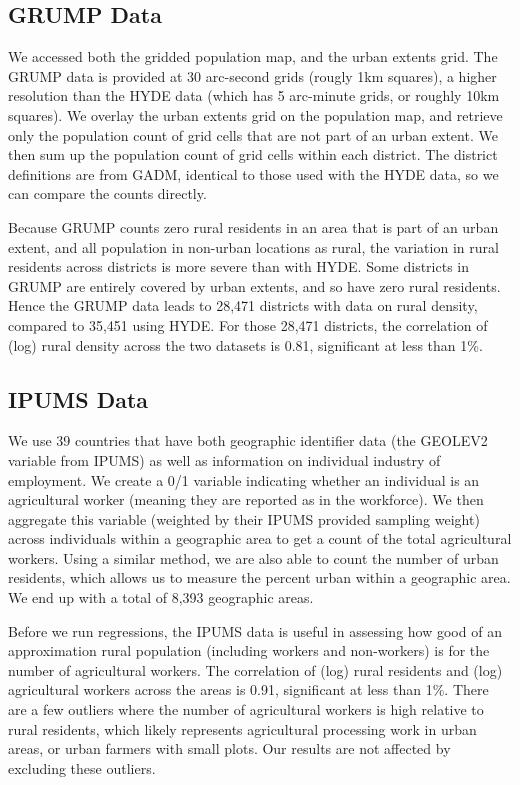 \documentclass[11pt]{article}
\begin{document}
\subsection{GRUMP Data}
We accessed both the gridded population map, and the urban extents grid. The GRUMP data is provided at 30 arc-second grids (rougly 1km squares), a higher resolution than the HYDE data (which has 5 arc-minute grids, or roughly 10km squares). We overlay the urban extents grid on the population map, and retrieve only the population count of grid cells that are not part of an urban extent. We then sum up the population count of grid cells within each district. The district definitions are from GADM, identical to those used with the HYDE data, so we can compare the counts directly.

Because GRUMP counts zero rural residents in an area that is part of an urban extent, and all population in non-urban locations as rural, the variation in rural residents across districts is more severe than with HYDE. Some districts in GRUMP are entirely covered by urban extents, and so have zero rural residents. Hence the GRUMP data leads to 28,471 districts with data on rural density, compared to 35,451 using HYDE. For those 28,471 districts, the correlation of (log) rural density across the two datasets is 0.81, significant at less than 1\%. 

\subsection{IPUMS Data}
We use 39 countries that have both geographic identifier data (the GEOLEV2 variable from IPUMS) as well as information on individual industry of employment. We create a 0/1 variable indicating whether an individual is an agricultural worker (meaning they are reported as in the workforce). We then aggregate this variable (weighted by their IPUMS provided sampling weight) across individuals within a geographic area to get a count of the total agricultural workers. Using a similar method, we are also able to count the number of urban residents, which allows us to measure the percent urban within a geographic area. We end up with a total of 8,393 geographic areas.

Before we run regressions, the IPUMS data is useful in assessing how good of an approximation rural population (including workers and non-workers) is for the number of agricultural workers. The correlation of (log) rural residents and (log) agricultural workers across the areas is 0.91, significant at less than 1\%. There are a few outliers where the number of agricultural workers is high relative to rural residents, which likely represents agricultural processing work in urban areas, or urban farmers with small plots. Our results are not affected by excluding these outliers.
\end{document}
